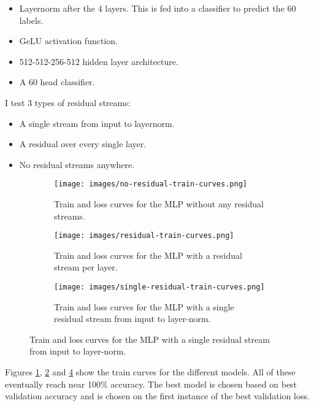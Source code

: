 \documentclass[]{article}
\begin{document}
\begin{itemize}
    \item Layernorm after the 4 layers. This is fed into a classifier to predict the 60 labels.
    \item GeLU activation function.
    \item 512-512-256-512 hidden layer architecture.
    \item A 60 head classifier.
\end{itemize}

I test 3 types of residual streams:
\begin{itemize}
    \item A single stream from input to layernorm.
    \item A residual over every single layer.
    \item No residual streams anywhere.
\end{itemize}

\begin{figure}
    \centering
    \begin{subfigure}{0.9\textwidth}
        \texttt{[image: images/no-residual-train-curves.png]}
        \caption{Train and loss curves for the MLP without any residual streams.}
        \label{fig:nr-train-curves}
    \end{subfigure}

    \begin{subfigure}{0.9\textwidth}
        \texttt{[image: images/residual-train-curves.png]}
        \caption{Train and loss curves for the MLP with a residual stream per layer.}
        \label{fig:r-train-curves}
    \end{subfigure}

    \begin{subfigure}{0.9\textwidth}
        \texttt{[image: images/single-residual-train-curves.png]}
        \caption{Train and loss curves for the MLP with a single residual stream from input to layer-norm.}
        \label{fig:sr-train-curves}
    \end{subfigure}
\end{figure}

Figures \ref{fig:nr-train-curves}, \ref{fig:r-train-curves} and \ref{fig:sr-train-curves} show the train curves for the different models.
All of these eventually reach near 100\% accuracy.
The best model is chosen based on best validation accuracy and is chosen on the first instance of the best validation loss.
\end{document}
